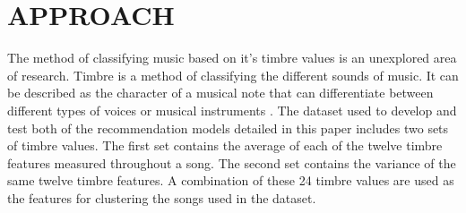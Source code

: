 \documentclass[letterpaper, 10 pt, conference]{ieeeconf}
\begin{document}

\section{APPROACH}
The method of classifying music based on it’s timbre values is an unexplored area of research. Timbre is a method of classifying the different sounds of music. It can be described as the character of a musical note that can differentiate between different types of voices or musical instruments \cite{one}. The dataset used to develop and test both of the recommendation models detailed in this paper includes two sets of timbre values. The first set contains the average of each of the twelve timbre features measured throughout a song. The second set contains the variance of the same twelve timbre features. A combination of these 24 timbre values are used as the features for clustering the songs used in the dataset.

\end{document}
